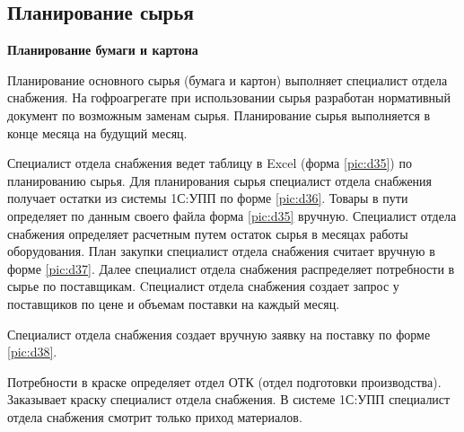\newpage
\subsection{Планирование сырья}
\label{bp:RawMaterialPlanning}

\textbf{Планирование бумаги и картона}

Планирование основного сырья (бумага и картон) выполняет специалист отдела снабжения.
На гофроагрегате при использовании сырья разработан нормативный документ по возможным заменам сырья. 
Планирование сырья выполняется в конце месяца на будущий месяц.

Специалист отдела снабжения ведет таблицу в Excel (форма \ref{pic:d35}) по планированию сырья.
Для планирования сырья специалист отдела снабжения получает остатки из системы 1С:УПП по форме \ref{pic:d36}.
Товары в пути определяет по данным своего файла форма \ref{pic:d35} вручную.
Специалист отдела снабжения определяет расчетным путем остаток сырья в месяцах работы оборудования.
План закупки специалист отдела снабжения считает вручную в форме \ref{pic:d37}.
Далее специалист отдела снабжения распределяет потребности в сырье по поставщикам. Cпециалист отдела снабжения создает запрос у поставщиков по цене и объемам поставки на каждый месяц.

Специалист отдела снабжения создает вручную заявку на поставку по форме \ref{pic:d38}.

Потребности в краске определяет отдел ОТК (отдел подготовки производства).
Заказывает краску специалист отдела снабжения.
В системе 1С:УПП специалист отдела снабжения смотрит только приход материалов.








